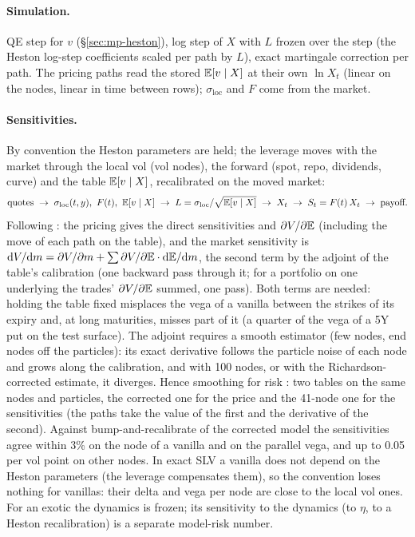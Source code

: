 \paragraph{Simulation.} QE step for $v$ (\S\ref{sec:mp-heston}), log step of $X$ with $L$ frozen over the step (the Heston
log-step coefficients scaled per path by $L$), exact martingale correction per path. The pricing paths read the stored
$\mathbb{E}[v \mid X]$ at their own $\ln X_t$ (linear on the nodes, linear in time between rows); $\sigma_{\mathrm{loc}}$ and $F$ come from the market.

\paragraph{Sensitivities.} By convention the Heston parameters are held; the leverage moves with the market through
the local vol (vol nodes), the forward (spot, repo, dividends, curve) and the table $\mathbb{E}[v \mid X]$, recalibrated on the
moved market:
\[
  \text{quotes} \;\to\; \sigma_{\mathrm{loc}}(t, y),\ F(t),\ \mathbb{E}[v \mid X] \;\to\; L = \sigma_{\mathrm{loc}}/\sqrt{\mathbb{E}[v \mid X]} \;\to\; X_t \;\to\; S_t = F(t)\,X_t \;\to\; \text{payoff}.
\]
Following \citet[ch.~13]{savine2018}: the pricing gives the direct sensitivities and $\partial V/\partial \mathbb{E}$ (including the move of each path
on the table), and the market sensitivity is $\mathrm{d}V/\mathrm{d}m = \partial V/\partial m + \sum \partial V/\partial \mathbb{E} \cdot \mathrm{d}\mathbb{E}/\mathrm{d}m$, the second term by the adjoint of
the table's calibration (one backward pass through it; for a portfolio on one underlying the trades' $\partial V/\partial \mathbb{E}$
summed, one pass). Both terms are needed: holding the table fixed misplaces the vega of a vanilla between the strikes
of its expiry and, at long maturities, misses part of it (a quarter of the vega of a 5Y put on the test surface). The
adjoint requires a smooth estimator (few nodes, end nodes off the particles): its exact derivative follows the
particle noise of each node and grows along the calibration, and with 100 nodes, or with the Richardson-corrected
estimate, it diverges. Hence smoothing for risk \citep{savine2018}: two tables on the same nodes and particles, the
corrected one for the price and the 41-node one for the sensitivities (the paths take the value of the first and the
derivative of the second). Against bump-and-recalibrate of the corrected model the sensitivities agree within 3\% on
the node of a vanilla and on the parallel vega, and up to 0.05 per vol point on other nodes. In exact
SLV a vanilla does not depend on the Heston parameters (the leverage compensates them), so the convention loses nothing
for vanillas: their delta and vega per node are close to the local vol ones. For an exotic the dynamics is frozen; its
sensitivity to the dynamics (to $\eta$, to a Heston recalibration) is a separate model-risk number.

